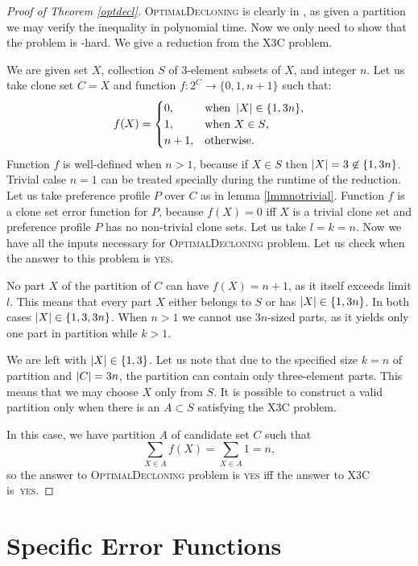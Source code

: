\begin{proof}[Proof of Theorem \ref{optdecl}]
\textsc{OptimalDecloning} is clearly in \np,
as given a partition we may verify the inequality in polynomial time.
Now we only need to show that the problem is \np-hard.
We give a reduction from the \textsc{X3C} problem.

We are given set $X$, collection $S$ of 3-element subsets of $X$, and integer $n$.
Let us take clone set $C = X$ and function $f:2^C\rightarrow \{0,1,n+1\}$ such that:
$$ f(X) =
\begin{cases}
0, &\text{when } \left\vert X \right\vert \in \{1,3n\} \text{,} \\
1, &\text{when }  X \in S \text{,} \\
n+1, &\text{otherwise.}
\end{cases}
$$
Function $f$ is well-defined when $n>1$, because if $X \in S$ then $\left\vert X \right\vert = 3 \not\in \{1,3n\}$.
Trivial calse $n=1$ can be treated specially during the runtime of the reduction.
Let us take preference profile $P$ over $C$ as in lemma \ref{lmmnotrivial}.
Function $f$ is a clone set error function for $P$, because $f(X) = 0$ iff $X$ is a trivial clone set
and preference profile $P$ has no non-trivial clone sets.
Let us take $l=k=n$.
Now we have all the inputs necessary for \textsc{OptimalDecloning} problem.
Let us check when the answer to this problem is \textsc{yes}.

No part $X$ of the partition of $C$ can have $f(X)=n+1$, as it itself exceeds limit $l$.
This means that every part $X$ either belongs to $S$ or has $\left\vert X \right\vert \in \{1,3n\}$.
In both cases $\left\vert X \right\vert \in \{1,3,3n\}$.
When $n>1$ we cannot use $3n$-sized parts,
as it yields only one part in partition while $k>1$.

We are left with $\left\vert X \right\vert \in \{1,3\}$.
Let us note that due to the specified size $k=n$ of partition and $\left\vert C \right\vert = 3n$,
the partition can contain only three-element parts.
This means that we may choose $X$ only from $S$.
It is possible to construct a valid partition only when there is an $A \subset S$ satisfying the \textsc{X3C} problem.

In this case, we have partition $A$ of candidate set $C$ such that
$$ \sum_{X \in A} f(X) = \sum_{X \in A} 1 = n,$$
so the answer to \textsc{OptimalDecloning} problem is \textsc{yes}
iff the answer to \textsc{X3C} is~\textsc{yes}.
\end{proof}



\section{Specific Error Functions}

